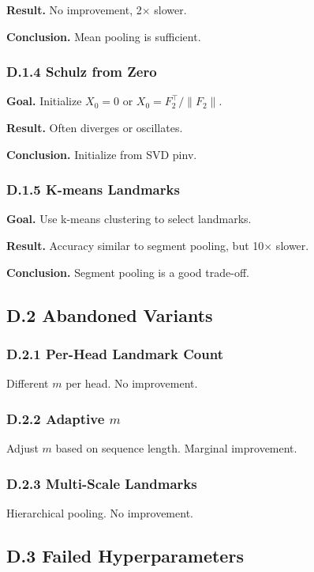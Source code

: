 \textbf{Result.} No improvement, 2$\times$ slower.

\textbf{Conclusion.} Mean pooling is sufficient.

\subsubsection{D.1.4 Schulz from Zero}

\textbf{Goal.} Initialize $X_0 = 0$ or $X_0 = F_2^\top / \|F_2\|$.

\textbf{Result.} Often diverges or oscillates.

\textbf{Conclusion.} Initialize from SVD pinv.

\subsubsection{D.1.5 K-means Landmarks}

\textbf{Goal.} Use k-means clustering to select landmarks.

\textbf{Result.} Accuracy similar to segment pooling, but 10$\times$ slower.

\textbf{Conclusion.} Segment pooling is a good trade-off.

\subsection{D.2 Abandoned Variants}

\subsubsection{D.2.1 Per-Head Landmark Count}

Different $m$ per head. No improvement.

\subsubsection{D.2.2 Adaptive $m$}

Adjust $m$ based on sequence length. Marginal improvement.

\subsubsection{D.2.3 Multi-Scale Landmarks}

Hierarchical pooling. No improvement.

\subsection{D.3 Failed Hyperparameters}

